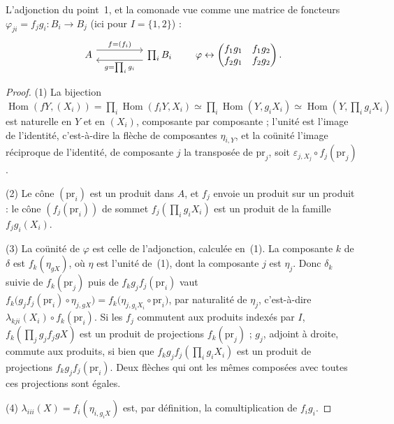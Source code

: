L'adjonction du point~1, et la comonade vue comme une matrice de foncteurs $\varphi_{ji} = f_j g_i : B_i \to B_j$ (ici pour $I = \{1, 2\}$) :
\[
\begin{tikzcd}[column sep=huge]
A \arrow[r, shift left=1.2ex, "{f = (f_i)}"] & \prod_i B_i \arrow[l, shift left=1.2ex, "{g = \prod_i g_i}"]
\end{tikzcd}
\qquad
\varphi \leftrightarrow \begin{pmatrix} f_1 g_1 & f_1 g_2 \\ f_2 g_1 & f_2 g_2 \end{pmatrix}.
\]

\begin{proof}
(1) La bijection $\operatorname{Hom}(fY, (X_i)) = \prod_i \operatorname{Hom}(f_i Y, X_i) \simeq \prod_i \operatorname{Hom}(Y, g_i X_i) \simeq \operatorname{Hom}(Y, \prod_i g_i X_i)$ est naturelle en $Y$ et en $(X_i)$, composante par composante ; l'unité est l'image de l'identité, c'est-à-dire la flèche de composantes $\eta_{i, Y}$, et la coünité l'image réciproque de l'identité, de composante $j$ la transposée de $\mathrm{pr}_j$, soit $\varepsilon_{j, X_j} \circ f_j(\mathrm{pr}_j)$.

(2) Le cône $(\mathrm{pr}_i)$ est un produit dans $A$, et $f_j$ envoie un produit sur un produit : le cône $(f_j(\mathrm{pr}_i))$ de sommet $f_j(\prod_i g_i X_i)$ est un produit de la famille $f_j g_i(X_i)$.

(3) La coünité de $\varphi$ est celle de l'adjonction, calculée en~(1). La composante $k$ de $\delta$ est $f_k(\eta_{gX})$, où $\eta$ est l'unité de~(1), dont la composante $j$ est $\eta_j$. Donc $\delta_k$ suivie de $f_k(\mathrm{pr}_j)$ puis de $f_k g_j f_j(\mathrm{pr}_i)$ vaut $f_k\bigl(g_j f_j(\mathrm{pr}_i) \circ \eta_{j, gX}\bigr) = f_k\bigl(\eta_{j, g_i X_i} \circ \mathrm{pr}_i\bigr)$, par naturalité de $\eta_j$, c'est-à-dire $\lambda_{kji}(X_i) \circ f_k(\mathrm{pr}_i)$. Si les $f_j$ commutent aux produits indexés par $I$, $f_k(\prod_j g_j f_j g X)$ est un produit de projections $f_k(\mathrm{pr}_j)$ ; $g_j$, adjoint à droite, commute aux produits, si bien que $f_k g_j f_j(\prod_i g_i X_i)$ est un produit de projections $f_k g_j f_j(\mathrm{pr}_i)$. Deux flèches qui ont les mêmes composées avec toutes ces projections sont égales.

(4) $\lambda_{iii}(X) = f_i(\eta_{i, g_i X})$ est, par définition, la comultiplication de $f_i g_i$.
\end{proof}

